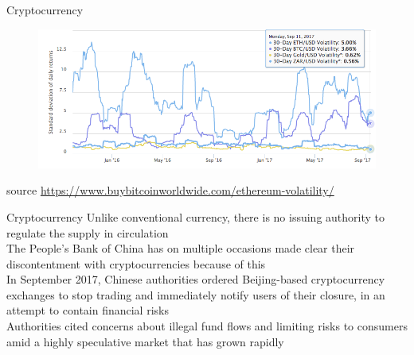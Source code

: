 \documentclass[9pt]{beamer}
\begin{document}


\begin{frame}{Cryptocurrency}
	\begin{figure}[]
		\centering
		\includegraphics  [width=4.in]{Images/vol}
	\end{figure}
	\begin{scriptsize}
		source \href{https://www.buybitcoinworldwide.com/ethereum-volatility/}{https://www.buybitcoinworldwide.com/ethereum-volatility/}
	\end{scriptsize}

\end{frame}



\begin{frame}{Cryptocurrency}
	Unlike conventional currency, there is no issuing authority to regulate the supply in circulation \\ \vspace{3mm}
	The People's Bank of China has on multiple occasions made clear their discontentment with cryptocurrencies because of this\\ \vspace{3mm}
	In September 2017, Chinese authorities ordered Beijing-based cryptocurrency exchanges to stop trading and immediately notify users of their closure, in an attempt to contain financial risks \\ \vspace{3mm}
	Authorities cited concerns about illegal fund flows and limiting risks to consumers amid a highly speculative market that has grown rapidly
\end{frame}

\end{document}
